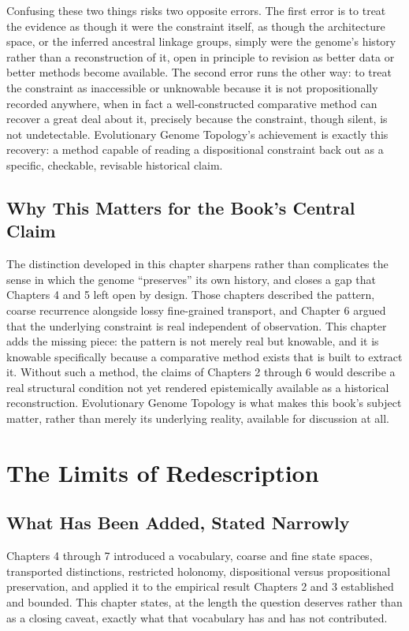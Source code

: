 \documentclass[11pt]{book}
\begin{document}
Confusing these two things risks two opposite errors. The first error is to treat the evidence as though it were the constraint itself, as though the architecture space, or the inferred ancestral linkage groups, simply were the genome's history rather than a reconstruction of it, open in principle to revision as better data or better methods become available. The second error runs the other way: to treat the constraint as inaccessible or unknowable because it is not propositionally recorded anywhere, when in fact a well-constructed comparative method can recover a great deal about it, precisely because the constraint, though silent, is not undetectable. Evolutionary Genome Topology's achievement is exactly this recovery: a method capable of reading a dispositional constraint back out as a specific, checkable, revisable historical claim.

\section{Why This Matters for the Book's Central Claim}

The distinction developed in this chapter sharpens rather than complicates the sense in which the genome ``preserves'' its own history, and closes a gap that Chapters 4 and 5 left open by design. Those chapters described the pattern, coarse recurrence alongside lossy fine-grained transport, and Chapter 6 argued that the underlying constraint is real independent of observation. This chapter adds the missing piece: the pattern is not merely real but knowable, and it is knowable specifically because a comparative method exists that is built to extract it. Without such a method, the claims of Chapters 2 through 6 would describe a real structural condition not yet rendered epistemically available as a historical reconstruction. Evolutionary Genome Topology is what makes this book's subject matter, rather than merely its underlying reality, available for discussion at all.

\chapter{The Limits of Redescription}

\section{What Has Been Added, Stated Narrowly}

Chapters 4 through 7 introduced a vocabulary, coarse and fine state spaces, transported distinctions, restricted holonomy, dispositional versus propositional preservation, and applied it to the empirical result Chapters 2 and 3 established and bounded. This chapter states, at the length the question deserves rather than as a closing caveat, exactly what that vocabulary has and has not contributed.
\end{document}
